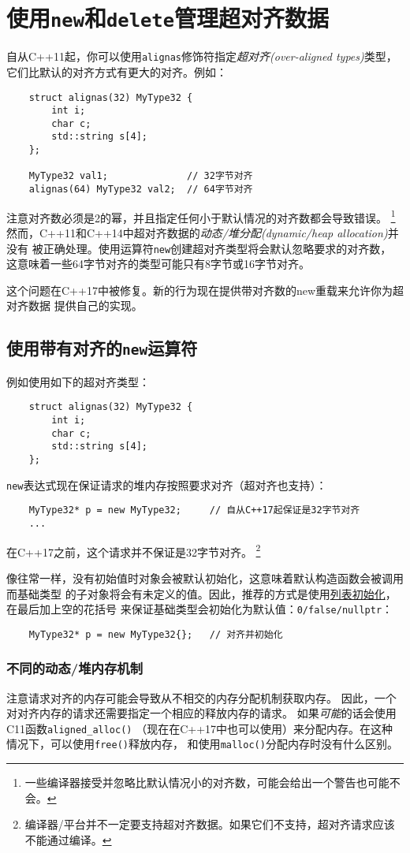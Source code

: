 \chapter{使用\texttt{new}和\texttt{delete}管理超对齐数据}\label{ch30}
自从C++11起，你可以使用\texttt{alignas}修饰符指定\emph{超对齐(over-aligned types)}类型，
它们比默认的对齐方式有更大的对齐。例如：
\begin{lstlisting}
    struct alignas(32) MyType32 {
        int i;
        char c;
        std::string s[4];
    };

    MyType32 val1;              // 32字节对齐
    alignas(64) MyType32 val2;  // 64字节对齐
\end{lstlisting}
注意对齐数必须是2的幂，并且指定任何小于默认情况的对齐数都会导致错误。
\footnote{一些编译器接受并忽略比默认情况小的对齐数，可能会给出一个警告也可能不会。}
然而，C++11和C++14中超对齐数据的\emph{动态/堆分配(dynamic/heap allocation)}并没有
被正确处理。使用运算符\texttt{new}创建超对齐类型将会默认忽略要求的对齐数，
这意味着一些64字节对齐的类型可能只有8字节或16字节对齐。

这个问题在C++17中被修复。新的行为现在提供带对齐数的new重载来允许你为超对齐数据
提供自己的实现。


\section{使用带有对齐的\texttt{new}运算符}
例如使用如下的超对齐类型：
\begin{lstlisting}
    struct alignas(32) MyType32 {
        int i;
        char c;
        std::string s[4];
    };
\end{lstlisting}
\texttt{new}表达式现在保证请求的堆内存按照要求对齐（超对齐也支持）：
\begin{lstlisting}
    MyType32* p = new MyType32;     // 自从C++17起保证是32字节对齐
    ...
\end{lstlisting}
在C++17之前，这个请求并不保证是32字节对齐。
\footnote{编译器/平台并不一定要支持超对齐数据。如果它们不支持，超对齐请求应该不能通过编译。}

像往常一样，没有初始值时对象会被默认初始化，这意味着默认构造函数会被调用而基础类型
的子对象将会有未定义的值。因此，推荐的方式是使用\hyperref[须知]{列表初始化}，在最后加上空的花括号
来保证基础类型会初始化为默认值：\texttt{0/false/nullptr}：
\begin{lstlisting}
    MyType32* p = new MyType32{};   // 对齐并初始化
\end{lstlisting}

\subsection{不同的动态/堆内存机制}\label{ch30.1.1}
注意请求对齐的内存可能会导致从不相交的内存分配机制获取内存。
因此，一个对对齐内存的请求还需要指定一个相应的释放内存的请求。
如果\emph{可能}的话会使用C11函数\texttt{aligned\_alloc()}
（现在在C++17中也可以使用）来分配内存。在这种情况下，可以使用\texttt{free()}释放内存，
和使用\texttt{malloc()}分配内存时没有什么区别。

